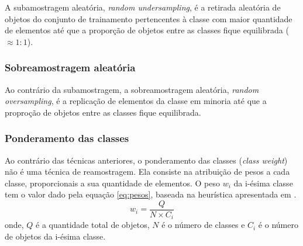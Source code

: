 A subamostragem aleatória, \emph{random undersampling}, é a retirada aleatória de objetos do conjunto de trainamento pertencentes à classe com maior quantidade de elementos até que a proporção de objetos entre as classes fique equilibrada ($\approx 1:1$).

\subsubsection{Sobreamostragem aleatória}
Ao contrário da subamostragem, a sobreamostragem aleatória, \emph{random oversampling}, é a replicação de elementos da classe em minoria até que a proproção de objetos entre as classes fique equilibrada.

\subsubsection{Ponderamento das classes}
Ao contrário das técnicas anteriores, o ponderamento das classes (\emph{class weight}) não é uma técnica de reamostragem. Ela consiste na atribuição de pesos a cada classe, proporcionais a sua quantidade de elementos.
O peso $w_i$ da i-ésima classe tem o valor dado pela equação \eqref{eq:pesos}, baseada na heurística apresentada em \cite{KinZen01}.
\begin{equation}
  w_i = \frac{Q}{N \times C_i}
  \label{eq:pesos}
\end{equation}
onde, $Q$ é a quantidade total de objetos, $N$ é o número de classes e $C_i$ é o número de objetos da i-ésima classe.
